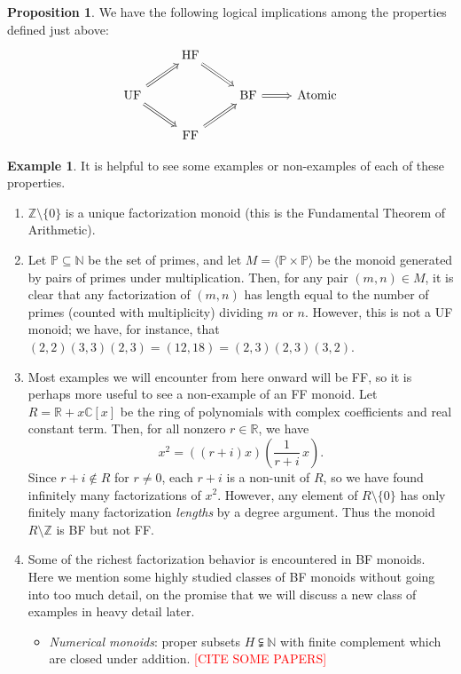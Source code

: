 \documentclass{report}
\newcommand{\NN}{\mathbb{N}}
\newcommand{\ZZ}{\mathbb{Z}}
\newcommand{\gen}[1]{\langle #1 \rangle}
\renewcommand{\:}{\text{:}}
\theoremstyle{definition}
\newtheorem{prop}[defn]{Proposition}
\newtheorem{eg}[defn]{Example}
\begin{document}
\begin{prop}
We have the following logical implications among the properties defined just above:
\[\begin{tikzcd}[arrows = Rightarrow]
 & \text{HF} \arrow{dr}&  &  \\
\text{UF} \arrow{ur}\arrow{dr}  &  & \text{BF} \arrow{r}& \text{Atomic} \\
 & \text{FF} \arrow{ur} &  & 
\end{tikzcd}\]
\end{prop}



\begin{eg}
It is helpful to see some examples or non-examples of each of these properties.
\begin{enumerate}[label={\rm (\roman{*})}]
\item $\ZZ\setminus \{0\}$ is a unique factorization monoid (this is the Fundamental Theorem of Arithmetic).
\item Let $\mathbb{P} \subseteq \NN$ be the set of primes, and let $M = \gen{\mathbb{P}\times \mathbb{P}}$ be the monoid generated by pairs of primes under multiplication.  
Then, for any pair $(m,n)\in M$, it is clear that any factorization of $(m,n)$ has length equal to the number of primes (counted with multiplicity) dividing $m$ or $n$.
However, this is not a UF monoid; we have, for instance, that $(2,2)(3,3)(2,3) = (12,18) = (2,3)(2,3)(3,2)$.
\item Most examples we will encounter from here onward will be FF, so it is perhaps more useful to see a non-example of an FF monoid.
Let $R = \mathbb{R} + x \mathbb{C}[x]$ be the ring of polynomials with complex coefficients and real constant term.
Then, for all nonzero $r\in \mathbb{R}$, we have
\[ x^2 = ((r+i)x)\left(\frac{1}{r+i}\,x\right). \]
Since $r+i\notin R$ for $r\neq0$, each $r+i$ is a non-unit of $R$, so we have found infinitely many factorizations of $x^2$.
However, any element of $R\setminus \{0\}$ has only finitely many factorization \textit{lengths} by a degree argument.
Thus the monoid $R\setminus \mathbb{Z}$ is BF but not FF.
\item Some of the richest factorization behavior is encountered in BF monoids.  
Here we mention some highly studied classes of BF monoids without going into too much detail, on the promise that we will discuss a new class of examples in heavy detail later.
\begin{itemize}
\item \textit{Numerical monoids}: proper subsets $H \subsetneqq \NN$ with finite complement which are closed under addition. \textcolor{red}{[CITE SOME PAPERS]}

\end{itemize}
\end{enumerate}
\end{eg}
\end{document}
